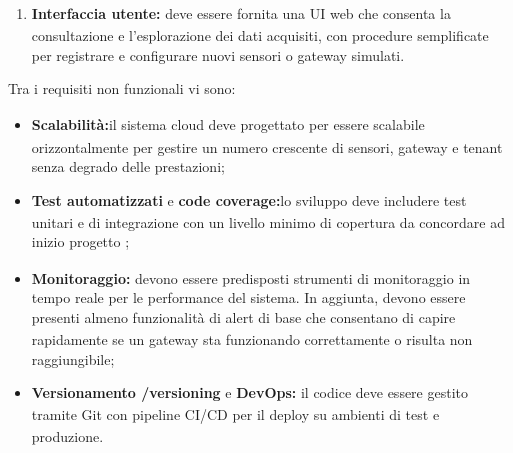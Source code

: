 \documentclass[a4paper,11pt]{article}
\begin{document}
\begin{enumerate}[noitemsep, topsep=0pt]
 \item \textbf{Interfaccia\textsubscript{} utente:} deve essere fornita una UI web che consenta la consultazione e l'esplorazione dei dati acquisiti, 
 con procedure semplificate per registrare e configurare nuovi sensori o gateway simulati.
\end{enumerate}
Tra i requisiti\textsubscript{}
 non funzionali\textsubscript{}
 vi sono: 
\begin{itemize}[noitemsep, topsep=0pt]
 \item \textbf{Scalabilità\textsubscript{}:}il sistema cloud deve progettato per essere scalabile orizzontalmente per gestire
un numero crescente di sensori, gateway e tenant senza degrado delle prestazioni;
 \item \textbf{Test\textsubscript{}
 automatizzati} e \textbf{code coverage\textsubscript{}:}lo sviluppo deve includere test\textsubscript{}
 unitari e di integrazione
con un livello minimo di copertura da concordare ad inizio progetto\textsubscript{}
;
 \item \textbf{Monitoraggio:} devono essere predisposti strumenti di monitoraggio in tempo reale per le performance del sistema. 
 In aggiunta, devono essere presenti almeno funzionalità\textsubscript{}
 di alert di base che consentano di capire rapidamente 
 se un gateway sta funzionando correttamente o risulta non raggiungibile;
 \item \textbf{Versionamento\textsubscript{}
/versioning\textsubscript{}
} e \textbf{DevOps:} il codice deve essere gestito tramite Git con pipeline CI/CD 
 per il deploy su ambienti di test\textsubscript{}
 e produzione.
\end{itemize}
\end{document}
